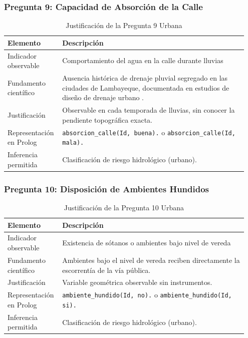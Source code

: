 \documentclass[12pt, letterpaper]{article}
\begin{document}
\subsubsection*{Pregunta 9: Capacidad de Absorción de la Calle}
\begin{table}[H]
\centering
\caption{Justificación de la Pregunta 9 Urbana}
\label{tab:p9u}
\begin{tabular}{@{}p{0.2\linewidth}p{0.75\linewidth}@{}}
\toprule
\textbf{Elemento} & \textbf{Descripción} \\ \midrule
Indicador observable & Comportamiento del agua en la calle durante lluvias \\
Fundamento científico & Ausencia histórica de drenaje pluvial segregado en las ciudades de Lambayeque, documentada en estudios de diseño de drenaje urbano \parencite{typsa_drenaje, usat_drenaje}. \\
Justificación & Observable en cada temporada de lluvias, sin conocer la pendiente topográfica exacta. \\
Representación en Prolog & \texttt{absorcion\_calle(Id, buena).} o \texttt{absorcion\_calle(Id, mala).} \\
Inferencia permitida & Clasificación de riesgo hidrológico (urbano). \\ \bottomrule
\end{tabular}
\end{table}

\subsubsection*{Pregunta 10: Disposición de Ambientes Hundidos}
\begin{table}[H]
\centering
\caption{Justificación de la Pregunta 10 Urbana}
\label{tab:p10u}
\begin{tabular}{@{}p{0.2\linewidth}p{0.75\linewidth}@{}}
\toprule
\textbf{Elemento} & \textbf{Descripción} \\ \midrule
Indicador observable & Existencia de sótanos o ambientes bajo nivel de vereda \\
Fundamento científico & Ambientes bajo el nivel de vereda reciben directamente la escorrentía de la vía pública. \\
Justificación & Variable geométrica observable sin instrumentos. \\
Representación en Prolog & \texttt{ambiente\_hundido(Id, no).} o \texttt{ambiente\_hundido(Id, si).} \\
Inferencia permitida & Clasificación de riesgo hidrológico (urbano). \\ \bottomrule
\end{tabular}
\end{table}
\end{document}
